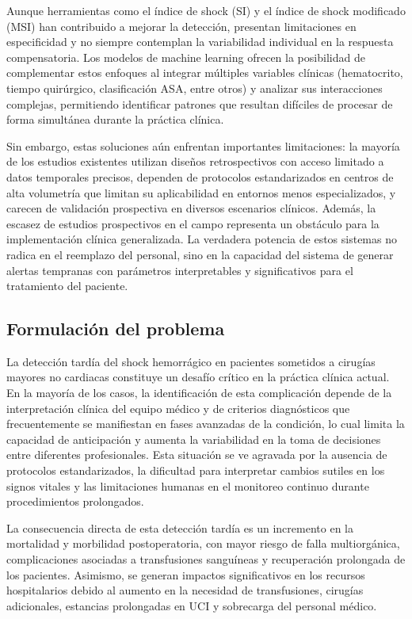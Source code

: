Aunque herramientas como el índice de shock (SI) y el índice de shock modificado (MSI) han contribuido a mejorar la detección, presentan limitaciones en especificidad y no siempre contemplan la variabilidad individual en la respuesta compensatoria. Los modelos de machine learning ofrecen la posibilidad de complementar estos enfoques al integrar múltiples variables clínicas (hematocrito, tiempo quirúrgico, clasificación ASA, entre otros) y analizar sus interacciones complejas, permitiendo identificar patrones que resultan difíciles de procesar de forma simultánea durante la práctica clínica.

Sin embargo, estas soluciones aún enfrentan importantes limitaciones: la mayoría de los estudios existentes utilizan diseños retrospectivos con acceso limitado a datos temporales precisos, dependen de protocolos estandarizados en centros de alta volumetría que limitan su aplicabilidad en entornos menos especializados, y carecen de validación prospectiva en diversos escenarios clínicos. Además, la escasez de estudios prospectivos en el campo representa un obstáculo para la implementación clínica generalizada. La verdadera potencia de estos sistemas no radica en el reemplazo del personal, sino en la capacidad del sistema de generar alertas tempranas con parámetros interpretables y significativos para el tratamiento del paciente.

\subsection{Formulación del problema}

La detección tardía del shock hemorrágico en pacientes sometidos a cirugías mayores no cardiacas constituye un desafío crítico en la práctica clínica actual. En la mayoría de los casos, la identificación de esta complicación depende de la interpretación clínica del equipo médico y de criterios diagnósticos que frecuentemente se manifiestan en fases avanzadas de la condición, lo cual limita la capacidad de anticipación y aumenta la variabilidad en la toma de decisiones entre diferentes profesionales. Esta situación se ve agravada por la ausencia de protocolos estandarizados, la dificultad para interpretar cambios sutiles en los signos vitales y las limitaciones humanas en el monitoreo continuo durante procedimientos prolongados.

La consecuencia directa de esta detección tardía es un incremento en la mortalidad y morbilidad postoperatoria, con mayor riesgo de falla multiorgánica, complicaciones asociadas a transfusiones sanguíneas y recuperación prolongada de los pacientes. Asimismo, se generan impactos significativos en los recursos hospitalarios debido al aumento en la necesidad de transfusiones, cirugías adicionales, estancias prolongadas en UCI y sobrecarga del personal médico.

